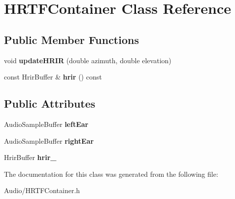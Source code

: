 \hypertarget{class_h_r_t_f_container}{}\section{H\+R\+T\+F\+Container Class Reference}
\label{class_h_r_t_f_container}
\subsection*{Public Member Functions}
\begin{DoxyCompactItemize}
\item 
\mbox{\label{class_h_r_t_f_container_aa161195100a640db166f5f97a71ec24a}} 
void {\bfseries update\+H\+R\+IR} (double azimuth, double elevation)
\item 
\mbox{\label{class_h_r_t_f_container_ad046e3424e66a7245062e92288dc2375}} 
const Hrir\+Buffer \& {\bfseries hrir} () const
\end{DoxyCompactItemize}
\subsection*{Public Attributes}
\begin{DoxyCompactItemize}
\item 
\mbox{\label{class_h_r_t_f_container_a675fdb70347737917fe1f2431f38a5f2}} 
Audio\+Sample\+Buffer {\bfseries left\+Ear}
\item 
\mbox{\label{class_h_r_t_f_container_afd9732627ecdbf70dde9d37b9d7f28a4}} 
Audio\+Sample\+Buffer {\bfseries right\+Ear}
\item 
\mbox{\label{class_h_r_t_f_container_a53ae96c68982ce8b7a736872d1f55fbc}} 
Hrir\+Buffer {\bfseries hrir\+\_\+}
\end{DoxyCompactItemize}


The documentation for this class was generated from the following file\+:\begin{DoxyCompactItemize}
\item 
Audio/H\+R\+T\+F\+Container.\+h\end{DoxyCompactItemize}
